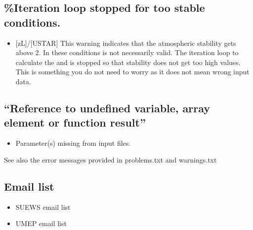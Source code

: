 \documentclass[letterpaper,10pt,english]{sphinxmanual}
\begin{document}
\subsection{\%Iteration loop stopped for too stable conditions.}
\label{\detokenize{troubleshooting:iteration-loop-stopped-for-too-stable-conditions}}\begin{itemize}
\item {} 
{[}zL{]}/{[}USTAR{]} This warning indicates that the atmospheric stability
gets above 2. In these conditions 
is not necessarily valid. The iteration loop to calculate the
and  is
stopped so that stability does not get too high values. This is
something you do not need to worry as it does not mean wrong input
data.

\end{itemize}


\subsection{“Reference to undefined variable, array element or function result”}
\label{\detokenize{troubleshooting:reference-to-undefined-variable-array-element-or-function-result}}\begin{itemize}
\item {} 
Parameter(s) missing from input files.

\end{itemize}

See also the error messages provided in problems.txt and warnings.txt


\subsection{Email list}
\label{\detokenize{troubleshooting:email-list}}\begin{itemize}
\item {} 
SUEWS email list

\end{itemize}

\begin{itemize}
\item {} 
UMEP email list

\end{itemize}
\end{document}
